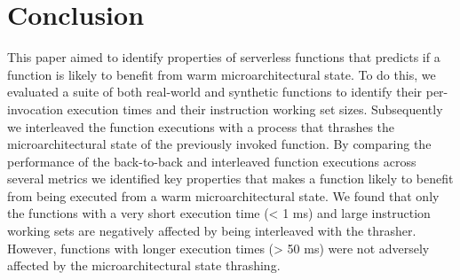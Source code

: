 \section{Conclusion}
\label{wosc:sec:conclusion}

This paper aimed to identify properties of serverless functions that predicts if a function is likely to benefit from warm microarchitectural state. To do this, we evaluated a suite of both real-world and synthetic functions to identify their per-invocation execution times and their instruction working set sizes. Subsequently we interleaved the function executions with a process that thrashes the microarchitectural state of the previously invoked function. By comparing the performance of the back-to-back and interleaved function executions across several metrics we identified key properties that makes a function likely to benefit from being executed from a warm microarchitectural state. We found that only the functions with a very short execution time (< 1 ms) and large instruction working sets are negatively affected by being interleaved with the thrasher. However, functions with longer execution times (> 50 ms) were not adversely affected by the microarchitectural state thrashing.



